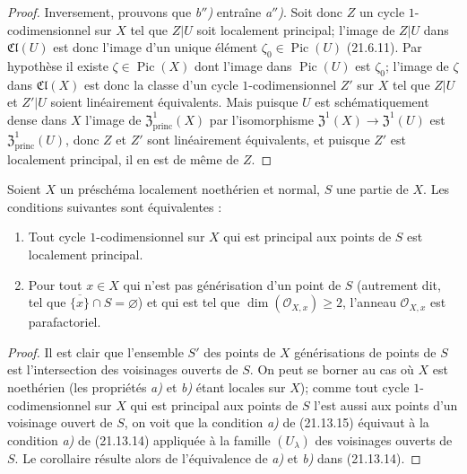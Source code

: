 \begin{proof}
Inversement, prouvons que \emph{b$''$)} entraîne \emph{a$''$)}. Soit donc $Z$ un cycle
$1$-codimensionnel sur $X$ tel que $Z|U$ soit localement principal; l'image de $Z|U$
dans $\mathfrak{Cl}(U)$ est donc l'image d'un unique élément
$\zeta_0\in\operatorname{Pic}(U)$ (21.6.11). Par hypothèse il existe
$\zeta\in\operatorname{Pic}(X)$ dont l'image dans $\operatorname{Pic}(U)$ est
$\zeta_0$; l'image de $\zeta$ dans $\mathfrak{Cl}(X)$ est donc la classe d'un cycle
$1$-codimensionnel $Z'$ sur $X$ tel que $Z|U$ et $Z'|U$ soient linéairement
équivalents. Mais puisque $U$ est schématiquement dense dans $X$ l'image de
$\mathfrak{Z}^1_{\mathrm{princ}}(X)$ par l'isomorphisme
$\mathfrak{Z}^1(X)\to\mathfrak{Z}^1(U)$ est $\mathfrak{Z}^1_{\mathrm{princ}}(U)$, donc $Z$
et $Z'$ sont linéairement équivalents, et puisque $Z'$ est localement principal, il
en est de même de $Z$.
\end{proof}

\begin{corollary}[21.13.15]
\label{IV.21.13.15}
Soient $X$ un préschéma localement noethérien et normal, $S$ une partie de $X$. Les
conditions suivantes sont équivalentes :
\begin{enumerate}[label=\emph{\alph*)}]
  \item Tout cycle $1$-codimensionnel sur $X$ qui est principal aux points de $S$ est
  localement principal.
  \item Pour tout $x\in X$ qui n'est pas générisation d'un point de $S$ \textup{(}autrement
  dit, tel que $\overline{\{x\}}\cap S=\varnothing$\textup{)} et qui est tel que
  $\dim(\mathcal O_{X,x})\geq2$, l'anneau $\mathcal O_{X,x}$ est parafactoriel.
\end{enumerate}
\end{corollary}

\begin{proof}
Il est clair que l'ensemble $S'$ des points de $X$ générisations de points de $S$ est
l'intersection des voisinages ouverts de $S$. On peut se borner au cas où $X$ est
noethérien (les propriétés \emph{a)} et \emph{b)} étant locales sur $X$); comme tout cycle
$1$-codimensionnel sur $X$ qui est principal aux points de $S$ l'est aussi aux points
d'un voisinage ouvert de $S$, on voit que la condition \emph{a)} de (21.13.15) équivaut à
la condition \emph{a)} de (21.13.14) appliquée à la famille $(U_\lambda)$ des voisinages
ouverts de $S$. Le corollaire résulte alors de l'équivalence de \emph{a)} et \emph{b)} dans
(21.13.14).
\end{proof}

